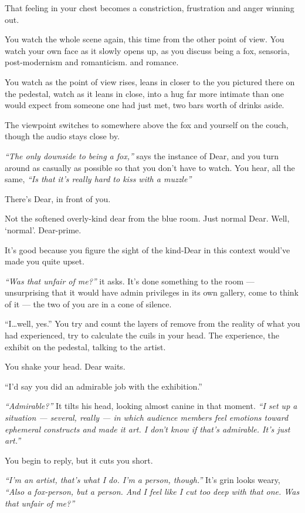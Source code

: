 That feeling in your chest becomes a constriction, frustration and anger winning out.

You watch the whole scene again, this time from the other point of view. You watch your own face as it slowly opens up, as you discuss being a fox, sensoria, post-modernism and romanticism. and romance.

You watch as the point of view rises, leans in closer to the you pictured there on the pedestal, watch as it leans in close, into a hug far more intimate than one would expect from someone one had just met, two bars worth of drinks aside.

The viewpoint switches to somewhere above the fox and yourself on the couch, though the audio stays close by.

\emph{``The only downside to being a fox,''} says the instance of Dear, and you turn around as casually as possible so that you don't have to watch. You hear, all the same, \emph{``Is that it's really hard to kiss with a muzzle''}

There's Dear, in front of you.

Not the softened overly-kind dear from the blue room. Just normal Dear. Well, `normal'. Dear-prime.

It's good because you figure the sight of the kind-Dear in this context would've made you quite upset.

\emph{``Was that unfair of me?''} it asks. It's done something to the room --- unsurprising that it would have admin privileges in its own gallery, come to think of it --- the two of you are in a cone of silence.

``I\ldots{}well, yes.'' You try and count the layers of remove from the reality of what you had experienced, try to calculate the cuils in your head. The experience, the exhibit on the pedestal, talking to the artist.

You shake your head. Dear waits.

``I'd say you did an admirable job with the exhibition.''

\emph{``Admirable?''} It tilts his head, looking almost canine in that moment. \emph{``I set up a situation --- several, really --- in which audience members feel emotions toward ephemeral constructs and made it art. I don't know if that's admirable. It's just art.''}

You begin to reply, but it cuts you short.

\emph{``I'm an artist, that's what I do. I'm a person, though.''} It's grin looks weary, \emph{``Also a fox-person, but a person. And I feel like I cut too deep with that one. Was that unfair of me?''}

